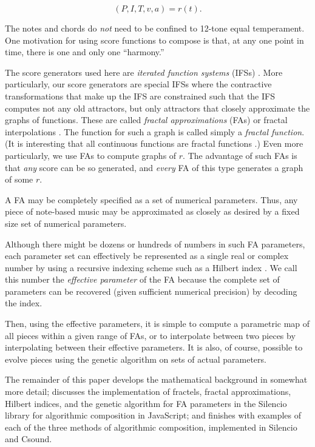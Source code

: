 \documentclass[english,11pt,letterpaper,onecolumn]{scrartcl}
\numberwithin{equation}{section}
\begin{document}
    $$(P, I, T, v, a) = r(t).$$ 
    
    \noindent The notes and chords do \textit{not} need to be confined to 
12-tone 
    equal temperament. One motivation for using score functions to compose is 
that, 
    at any one point in time, there is one and only one ``harmony.''
    
    The score generators used here are \textit{iterated function systems} 
(IFSs) 
    \cite{barnsley1985iterated, 10.2307/24893080, fractalseverywhere}. More 
    particularly, our score generators are special IFSs where the contractive 
    transformations that make up the IFS are constrained such that the IFS 
computes 
    not any old attractors, but only attractors that closely approximate the 
graphs 
    of functions. These are called \textit{fractal approximations} (FAs) or 
fractal 
    interpolations \cite{Barnsley1986, fractalseverywhere, 
navascues2014fractal}. 
    The function for such a graph is called simply a \textit{fractal function}. 
(It 
    is interesting that all continuous functions are fractal functions 
    \cite{2016arXiv161001369B}.) Even more particularly, we use FAs to compute 
    graphs of $r$. The advantage of such FAs is that \textit{any} score can be 
so 
    generated, and \textit{every} FA of this type generates a graph of some 
$r$.
    
    A FA may be completely specified as a set of numerical parameters. Thus, 
any 
    piece of note-based music may be approximated as closely as desired by a 
fixed 
    size set of numerical parameters.
    
    Although there might be dozens or hundreds of numbers in such FA 
parameters, 
    each parameter set can effectively be represented as a single real or 
complex 
    number by using a recursive indexing scheme such as a Hilbert index 
    \cite{hamilton2006compact}. We call this number the \textit{effective 
        parameter} of the FA because the complete set of parameters can be 
    recovered (given sufficient numerical precision) by decoding the index. 
    
    Then, using the effective parameters, it is simple to compute a parametric 
map 
    of all pieces within a given range of FAs, or to interpolate between two 
pieces 
    by interpolating between their effective parameters. It is also, of 
course, 
    possible to evolve pieces using the genetic algorithm on sets of actual 
    parameters.
    
    The remainder of this paper develops the mathematical background in 
somewhat 
    more detail; discusses the implementation of fractels, fractal 
approximations, 
    Hilbert indices, and the genetic algorithm for FA parameters in the 
Silencio 
    library for algorithmic composition in JavaScript; and finishes with 
examples 
    of each of the three methods of algorithmic composition, implemented in 
    Silencio and Csound.
    
\end{document}
